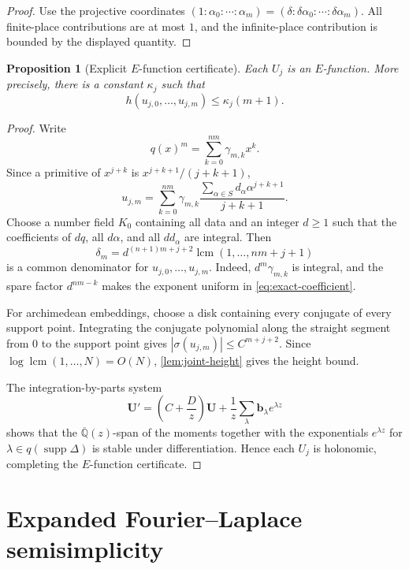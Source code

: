 \documentclass[11pt]{article}
\numberwithin{equation}{section}
\newtheorem{proposition}[theorem]{Proposition}
\theoremstyle{definition}
\theoremstyle{remark}
\newcommand{\Qbar}{\overline{\mathbb Q}}
\begin{document}
\begin{proof}
Use the projective coordinates
$(1:\alpha_0:\cdots:\alpha_m)=(\delta:\delta\alpha_0:\cdots:\delta\alpha_m)$.
All finite-place contributions are at most $1$, and the infinite-place
contribution is bounded by the displayed quantity.
\end{proof}

\begin{proposition}[Explicit $E$-function certificate]\label{prop:E-certificate}
Each $U_j$ is an $E$-function.  More precisely, there is a constant
$\kappa_j$ such that
\[
  h(u_{j,0},\ldots,u_{j,m})\le\kappa_j(m+1).
\]
\end{proposition}

\begin{proof}
Write
\[
  q(x)^m=\sum_{k=0}^{nm}\gamma_{m,k}x^k.
\]
Since a primitive of $x^{j+k}$ is $x^{j+k+1}/(j+k+1)$,
\begin{equation}\label{eq:exact-coefficient}
  u_{j,m}=\sum_{k=0}^{nm}\gamma_{m,k}
  \frac{\sum_{\alpha\in S}d_\alpha\alpha^{j+k+1}}{j+k+1}.
\end{equation}
Choose a number field $K_0$ containing all data and an integer $d\ge1$ such
that the coefficients of $dq$, all $d\alpha$, and all $dd_\alpha$ are
integral.  Then
\[
  \delta_m=
  d^{(n+1)m+j+2}\operatorname{lcm}(1,\ldots,nm+j+1)
\]
is a common denominator for $u_{j,0},\ldots,u_{j,m}$.  Indeed,
$d^m\gamma_{m,k}$ is integral, and the spare factor $d^{nm-k}$ makes the
exponent uniform in \eqref{eq:exact-coefficient}.

For archimedean embeddings, choose a disk containing every conjugate of every
support point.  Integrating the conjugate polynomial along the straight segment
from $0$ to the support point gives
$|\sigma(u_{j,m})|\le C^{m+j+2}$.  Since
$\log\operatorname{lcm}(1,\ldots,N)=O(N)$, \cref{lem:joint-height} gives the
height bound.

The integration-by-parts system
\[
  \mathbf U'=\left(C+\frac Dz\right)\mathbf U
  +\frac1z\sum_\lambda\mathbf b_\lambda e^{\lambda z}
\]
shows that the $\Qbar(z)$-span of the moments together with the exponentials $e^{\lambda z}$ for
$\lambda\in q(\operatorname{supp}\Delta)$ is
stable under differentiation.  Hence each $U_j$ is holonomic, completing the
$E$-function certificate.
\end{proof}

\section{Expanded Fourier--Laplace semisimplicity}
\end{document}
